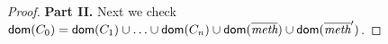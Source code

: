 \begin{proof}
\noindent\textbf{Part II.} Next we check $\textsf{dom}(C_0)=\textsf{dom}(C_1)\cup\ldots\cup\textsf{dom}(C_n)\cup\textsf{dom}(\overline{\textit{meth}})\cup\textsf{dom}(\overline{\textit{meth}}')$.

\end{proof}








